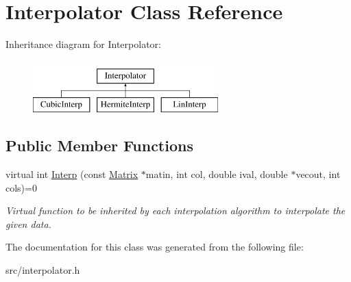 \hypertarget{classInterpolator}{
\section{Interpolator Class Reference}
\label{d3/df3/classInterpolator}
}
Inheritance diagram for Interpolator:\begin{figure}[H]
\begin{center}
\leavevmode
\includegraphics[height=2cm]{d3/df3/classInterpolator}
\end{center}
\end{figure}
\subsection*{Public Member Functions}
\begin{DoxyCompactItemize}
\item 
\hypertarget{classInterpolator_a2238defccb009047f624bda33cc47c73}{
virtual int \hyperlink{classInterpolator_a2238defccb009047f624bda33cc47c73}{Interp} (const \hyperlink{classMatrix}{Matrix} $\ast$matin, int col, double ival, double $\ast$vecout, int cols)=0}
\label{d3/df3/classInterpolator_a2238defccb009047f624bda33cc47c73}

\begin{DoxyCompactList}\small\item\em Virtual function to be inherited by each interpolation algorithm to interpolate the given data. \item\end{DoxyCompactList}\end{DoxyCompactItemize}


The documentation for this class was generated from the following file:\begin{DoxyCompactItemize}
\item 
src/interpolator.h\end{DoxyCompactItemize}
